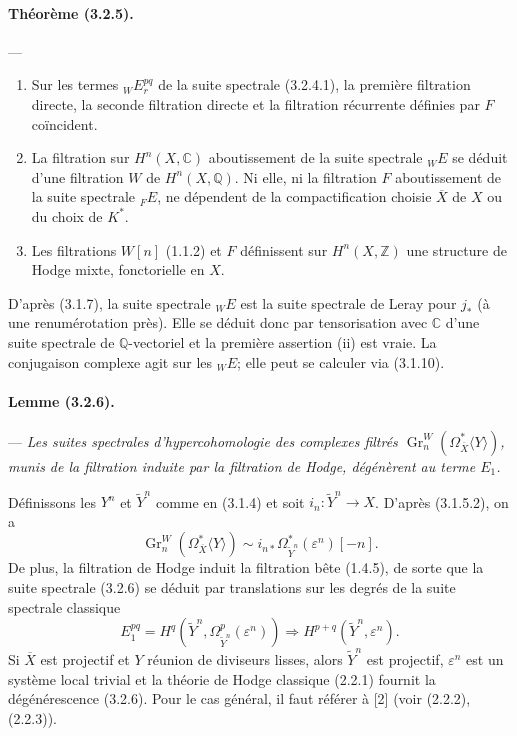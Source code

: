\documentclass[10pt]{article}
\newcommand{\C}{\mathbb C}
\newcommand{\Q}{\mathbb Q}
\newcommand{\Z}{\mathbb Z}
\newcommand{\Gr}{\operatorname{Gr}}
\begin{document}
\paragraph{Théorème (3.2.5).} --- {\itshape
\begin{enumerate}[label=(\roman*),font=\itshape]
\item Sur les termes ${}_WE_r^{pq}$ de la suite spectrale (3.2.4.1), la première filtration directe, la seconde filtration directe et la filtration récurrente définies par $F$ coïncident.
\item La filtration sur $H^n(X,\C)$ aboutissement de la suite spectrale ${}_WE$ se déduit d'une filtration $W$ de $H^n(X,\Q)$. Ni elle, ni la filtration $F$ aboutissement de la suite spectrale ${}_FE$, ne dépendent de la compactification choisie $\overline X$ de $X$ ou du choix de $K^*$.
\item Les filtrations $W[n]$ (1.1.2) et $F$ définissent sur $H^n(X,\Z)$ une structure de Hodge mixte, fonctorielle en $X$.
\end{enumerate}}

D'après (3.1.7), la suite spectrale ${}_WE$ est la suite spectrale de Leray pour $j_*$ (à une renumérotation près). Elle se déduit donc par tensorisation avec $\C$ d'une suite spectrale de $\Q$-vectoriel et la première assertion (ii) est vraie. La conjugaison complexe agit sur les ${}_WE$; elle peut se calculer via (3.1.10).

\paragraph{Lemme (3.2.6).} --- {\itshape Les suites spectrales d'hypercohomologie des complexes filtrés $\Gr_n^W(\Omega_{\overline X}^{*}\langle Y\rangle)$, munis de la filtration induite par la filtration de Hodge, dégénèrent au terme $E_1$.}

Définissons les $Y^n$ et $\widetilde Y^n$ comme en (3.1.4) et soit $i_n:\widetilde Y^n\to X$. D'après (3.1.5.2), on a
\[
\Gr_n^W(\Omega_{\overline X}^{*}\langle Y\rangle)
\sim i_{n*}\Omega_{\widetilde Y^n}^{*}(\varepsilon^n)[-n].
\]
De plus, la filtration de Hodge induit la filtration bête (1.4.5), de sorte que la suite spectrale (3.2.6) se déduit par translations sur les degrés de la suite spectrale classique
\[
E_1^{pq}=H^q(\widetilde Y^n,\Omega_{\widetilde Y^n}^p(\varepsilon^n))
\Rightarrow H^{p+q}(\widetilde Y^n,\varepsilon^n).
\]
Si $\overline X$ est projectif et $Y$ réunion de diviseurs lisses, alors $\widetilde Y^n$ est projectif, $\varepsilon^n$ est un système local trivial et la théorie de Hodge classique (2.2.1) fournit la dégénérescence (3.2.6). Pour le cas général, il faut référer à [2] (voir (2.2.2), (2.2.3)).
\end{document}
